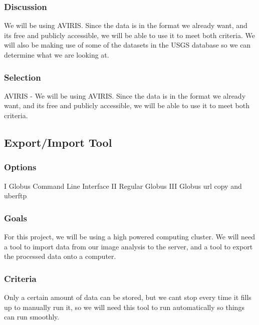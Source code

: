 \documentclass[10pt,draftclsnofoot,onecolumn,journal,compsoc]{IEEEtran}
\begin{document}
\subsubsection{Discussion}
We will be using AVIRIS. Since the data is in the format we already want, and its free and publicly accessible,
we will be able to use it to meet both criteria. We will also be making use of some of the datasets in the USGS
database so we can determine what we are looking at.

\subsubsection{Selection}
\noindent AVIRIS - We will be using AVIRIS. Since the data is in the format we already want, and its free and publicly accessible,
we will be able to use it to meet both criteria.

\subsection{Export/Import Tool}

\subsubsection{Options}
\noindent I Globus Command Line Interface \newline
\noindent II Regular Globus \newline
\noindent III Globus url copy and uberftp

\subsubsection{Goals}
\noindent For this project, we will be using a high powered computing cluster. We will need a tool to import data from
our image analysis to the server, and a tool to export the processed data onto a computer.

\subsubsection{Criteria}
\noindent Only a certain amount
of data can be stored, but we cant stop every time it fills up to manually run it, so we will need this tool to run
automatically so things can run smoothly.
\end{document}
